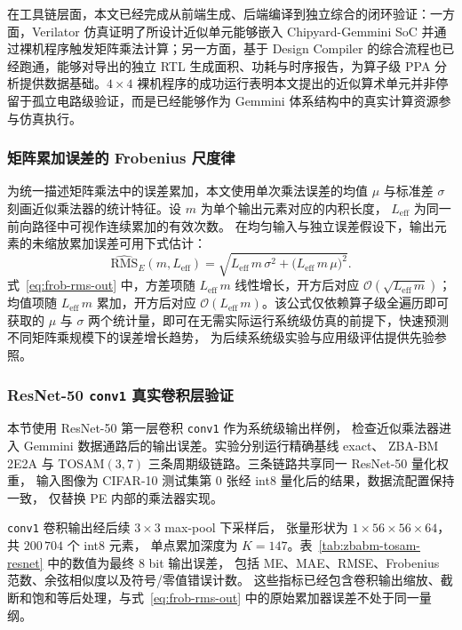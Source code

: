 \documentclass[12pt,a4paper,UTF8]{article}
\begin{document}
在工具链层面，本文已经完成从前端生成、后端编译到独立综合的闭环验证：一方面，Verilator 仿真证明了所设计近似单元能够嵌入 Chipyard-Gemmini SoC 并通过裸机程序触发矩阵乘法计算；另一方面，基于 Design Compiler 的综合流程也已经跑通，能够对导出的独立 RTL 生成面积、功耗与时序报告，为算子级 PPA 分析提供数据基础。$4 \times 4$ 裸机程序的成功运行表明本文提出的近似算术单元并非停留于孤立电路级验证，而是已经能够作为 Gemmini 体系结构中的真实计算资源参与仿真执行。

\subsubsection{矩阵累加误差的 Frobenius 尺度律}
为统一描述矩阵乘法中的误差累加，本文使用单次乘法误差的均值 $\mu$ 与标准差 $\sigma$
刻画近似乘法器的统计特征。设 $m$ 为单个输出元素对应的内积长度，
$L_{\mathrm{eff}}$ 为同一前向路径中可视作连续累加的有效次数。
在均匀输入与独立误差假设下，输出元素的未缩放累加误差可用下式估计\cite{liu2025frobenius}：
\begin{equation}
\label{eq:frob-rms-out}
\widehat{\mathrm{RMS}}_{\!E}(m,L_{\mathrm{eff}}) =
\sqrt{L_{\mathrm{eff}}\,m\,\sigma^2 + \bigl(L_{\mathrm{eff}}\,m\,\mu\bigr)^2}.
\end{equation}
式~\eqref{eq:frob-rms-out} 中，方差项随 $L_{\mathrm{eff}}\,m$ 线性增长，开方后对应
$\mathcal{O}(\sqrt{L_{\mathrm{eff}}\,m})$；均值项随 $L_{\mathrm{eff}}\,m$ 累加，开方后对应
$\mathcal{O}(L_{\mathrm{eff}}\,m)$。该公式仅依赖算子级全遍历即可获取的 $\mu$ 与 $\sigma$
两个统计量，即可在无需实际运行系统级仿真的前提下，快速预测不同矩阵乘规模下的误差增长趋势，
为后续系统级实验与应用级评估提供先验参照。

\subsubsection{ResNet-50 \texttt{conv1} 真实卷积层验证}
\label{subsec:zbabm-tosam-resnet}

本节使用 ResNet-50 第一层卷积 \texttt{conv1} 作为系统级输出样例，
检查近似乘法器进入 Gemmini 数据通路后的输出误差。实验分别运行精确基线 exact、
ZBA-BM 2E2A 与 TOSAM$(3,7)$ 三条周期级链路。三条链路共享同一 ResNet-50 量化权重，
输入图像为 CIFAR-10 测试集第 0 张经 int8 量化后的结果，数据流配置保持一致，
仅替换 PE 内部的乘法器实现。

\texttt{conv1} 卷积输出经后续 $3\times3$ max-pool 下采样后，
张量形状为 $1 \times 56 \times 56 \times 64$，共 $200\,704$ 个 int8 元素，
单点累加深度为 $K=147$。表~\ref{tab:zbabm-tosam-resnet} 中的数值为最终 8 bit 输出误差，
包括 ME、MAE、RMSE、Frobenius 范数、余弦相似度以及符号/零值错误计数。
这些指标已经包含卷积输出缩放、截断和饱和等后处理，与式~\eqref{eq:frob-rms-out}
中的原始累加器误差不处于同一量纲。
\end{document}
